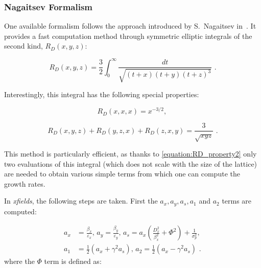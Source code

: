 \subsubsection{Nagaitsev Formalism}  

One available formalism follows the approach introduced by S.~Nagaitsev in~\cite{PRAB:Nagaitsev:IBS_formulas_fast_numerical_evaluation}.
It provides a fast computation method through symmetric elliptic integrals of the second kind, \(R_D(x,y,z)\):

\begin{equation}
    R_D(x, y, z) = \frac{3}{2} \int_{0}^{\infty} \frac{dt}{\sqrt{(t + x)(t + y)(t + z)^3}} \text{ .}
    \label{equation:elliptic_integrals}
\end{equation}

Interestingly, this integral has the following special properties:

\begin{equation}
    R_D(x, x, x) = x^{-3/2} \text{,  }
    \label{equation:RD_property1}
\end{equation}

\begin{equation}
    R_D(x, y, z) + R_D(y, z, x) + R_D(z, x, y) = \frac{3}{\sqrt{xyz}} \text{ .}
    \label{equation:RD_property2}
\end{equation}

This method is particularly efficient, as thanks to \eqref{equation:RD_property2} only two evaluations of this integral (which does not scale with the size of the lattice) are needed to obtain various simple terms from which one can compute the growth rates.
\newline

In \textit{xfields}, the following steps are taken.
First the \(a_x, a_y, a_s, a_1\) and \(a_2\) terms are computed:

\begin{equation}
    \begin{aligned}
        a_x &= \frac{\beta_x}{\varepsilon_x} \text{,  }
        a_y = \frac{\beta_y}{\varepsilon_y} \text{,  }
        a_s = a_x \left( \frac{D_x^{2}}{\beta_x^{2}} + \Phi^2 \right) + \frac{1}{\sigma_p^{2}} \text{,  } \\
        a_1 &= \frac{1}{2} (a_x + \gamma^2 a_s) \text{,  }
        a_2 = \frac{1}{2} (a_x - \gamma^2 a_s) \text{ .}
    \end{aligned}
    \label{equation:nagaitsev_step1}
\end{equation}
where the \(\Phi\) term is defined as:

